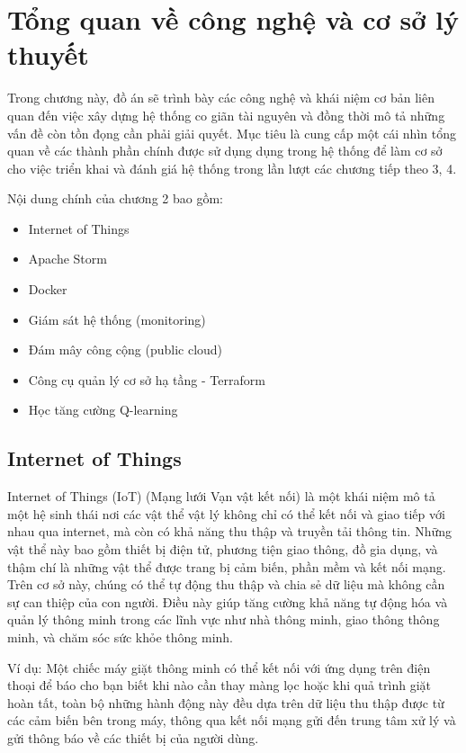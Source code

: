 \chapter{Tổng quan về công nghệ và cơ sở lý thuyết}

Trong chương này, đồ án sẽ trình bày các công nghệ và khái niệm cơ bản liên quan đến việc xây dựng hệ thống co giãn tài nguyên và đồng thời mô tả những vấn đề còn tồn đọng cần phải giải quyết. Mục tiêu là cung cấp một cái nhìn tổng quan về các thành phần chính được sử dụng dụng trong hệ thống để làm cơ sở cho việc triển khai và đánh giá hệ thống trong lần lượt các chương tiếp theo 3, 4.

Nội dung chính của chương 2 bao gồm:
\begin{itemize}
    \item Internet of Things
    \item Apache Storm
    \item Docker
    \item Giám sát hệ thống (monitoring)
    \item Đám mây công cộng (public cloud)
    \item Công cụ quản lý cơ sở hạ tầng - Terraform
    \item Học tăng cường Q-learning
\end{itemize}

\section{Internet of Things}

Internet of Things (IoT) (Mạng lưới Vạn vật kết nối) là một khái niệm mô tả một hệ sinh thái nơi các vật thể vật lý không chỉ có thể kết nối và giao tiếp với nhau qua internet, mà còn có khả năng thu thập và truyền tải thông tin. Những vật thể này bao gồm thiết bị điện tử, phương tiện giao thông, đồ gia dụng, và thậm chí là những vật thể được trang bị cảm biến, phần mềm và kết nối mạng. Trên cơ sở này, chúng có thể tự động thu thập và chia sẻ dữ liệu mà không cần sự can thiệp của con người. Điều này giúp tăng cường khả năng tự động hóa và quản lý thông minh trong các lĩnh vực như nhà thông minh, giao thông thông minh, và chăm sóc sức khỏe thông minh.

Ví dụ: Một chiếc máy giặt thông minh có thể kết nối với ứng dụng trên điện thoại để báo cho bạn biết khi nào cần thay màng lọc hoặc khi quả trình giặt hoàn tất, toàn bộ những hành động này đều dựa trên dữ liệu thu thập được từ các cảm biến bên trong máy, thông qua kết nối mạng gửi đến trung tâm xử lý và gửi thông báo về các thiết bị của người dùng.

